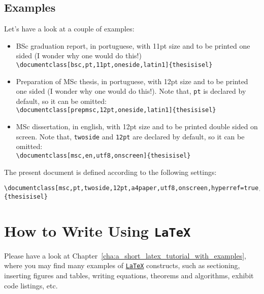 \subsection{Examples} %
\label{ssec:examples}

Let's have a look at a couple of examples:

\begin{itemize}
	\item BSc graduation report, in portuguese, with 11pt size and to be printed one sided (I wonder why one would do this!)\\
	\verb!\documentclass[bsc,pt,11pt,oneside,latin1]{thesisisel}!
	\item Preparation of MSc thesis, in portuguese, with 12pt size and to be printed one sided (I wonder why one would do this!). Note that, \verb!pt! is declared by default, so it can be omitted: \\
	\verb!\documentclass[prepmsc,12pt,oneside,latin1]{thesisisel}!
	\item MSc dissertation, in english, with 12pt size and to be printed double sided on screen. Note that, \verb!twoside! and \verb!12pt! are declared by default, so it can be omitted: \\
	\verb!\documentclass[msc,en,utf8,onscreen]{thesisisel}!
\end{itemize}


The present document is defined according to the following settings:
\begin{Verbatim}[breaklines=true, breakanywhere=true]
\documentclass[msc,pt,twoside,12pt,a4paper,utf8,onscreen,hyperref=true,listof=totoc] {thesisisel}
\end{Verbatim}

	
\section{How to Write Using \texttt{LaTeX}} %
\label{sec:how_to_write_using_latex}

Please have a look at Chapter~\ref{cha:a_short_latex_tutorial_with_examples}, where you may find many examples of \href{http://tobi.oetiker.ch/lshort/lshort.pdf}{\texttt{LaTeX}} constructs, such as sectioning, inserting figures and tables, writing equations, theorems and algorithms, exhibit code listings, etc.

